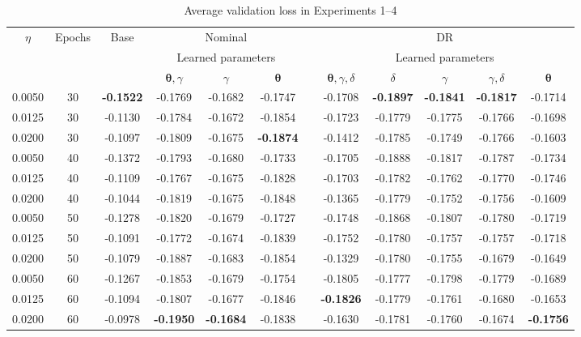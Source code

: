 \documentclass[10pt, twocolumn]{article}
\theoremstyle{plain}
\theoremstyle{definition}
\begin{document}
\begin{appendices}
\begin{table}[!ht]
\caption{Average validation loss in Experiments 1--4}
\centering
\begin{tabular}{ccccccr@{}ccccc}
\toprule
		$\eta$ &  Epochs & Base & \multicolumn{3}{c}{Nominal} && \multicolumn{5}{c}{DR} \\[0.5ex] \cline{4-6} \cline{8-12}
&&& \multicolumn{3}{c}{\footnotesize Learned parameters} && \multicolumn{5}{c}{\footnotesize Learned parameters}\\[-0.5ex]
\rule{0pt}{3ex}&& & \(\bm{\theta}, \gamma\) & \(\gamma\) & \(\bm{\theta}\) && \(\bm{\theta}, \gamma, \delta\) & \(\delta\) & \(\gamma\) & \(\gamma, \delta\) & \(\bm{\theta}\) \\
\midrule
0.0050 & 30 & \textbf{-0.1522} & -0.1769 & -0.1682 & -0.1747 && -0.1708 & \textbf{-0.1897} & \textbf{-0.1841} & \textbf{-0.1817} & -0.1714 \\
0.0125 & 30 & -0.1130 & -0.1784 & -0.1672 & -0.1854 && -0.1723 & -0.1779 & -0.1775 & -0.1766 &  -0.1698 \\
0.0200 & 30 & -0.1097 & -0.1809 & -0.1675 & \textbf{-0.1874} && -0.1412 & -0.1785 & -0.1749 & -0.1766 &     -0.1603 \\
\midrule
0.0050 & 40 & -0.1372 & -0.1793 & -0.1680 & -0.1733 && -0.1705 & -0.1888 & -0.1817 & -0.1787 &     -0.1734 \\
0.0125 & 40 & -0.1109 & -0.1767 & -0.1675 & -0.1828 && -0.1703 & -0.1782 & -0.1762 & -0.1770 &  -0.1746 \\
0.0200 & 40 & -0.1044 & -0.1819 & -0.1675 & -0.1848 && -0.1365 & -0.1779 & -0.1752 & -0.1756 & -0.1609 \\
\midrule
0.0050 & 50 & -0.1278 & -0.1820 & -0.1679 & -0.1727 && -0.1748 & -0.1868 & -0.1807 & -0.1780 & -0.1719 \\
0.0125 & 50 & -0.1091 & -0.1772 & -0.1674 & -0.1839 && -0.1752 & -0.1780 & -0.1757 & -0.1757 & -0.1718 \\
0.0200 & 50 & -0.1079 & -0.1887 & -0.1683 & -0.1854 && -0.1329 & -0.1780 & -0.1755 & -0.1679 & -0.1649 \\
\midrule
0.0050 & 60 & -0.1267 & -0.1853 & -0.1679 & -0.1754 && -0.1805 & -0.1777 & -0.1798 & -0.1779 & -0.1689 \\
0.0125 & 60 & -0.1094 & -0.1807 & -0.1677 & -0.1846 && \textbf{-0.1826} & -0.1779 & -0.1761 & -0.1680 & -0.1653 \\
0.0200 & 60 & -0.0978 & \textbf{-0.1950} & \textbf{-0.1684} & -0.1838 && -0.1630 & -0.1781 & -0.1760 & -0.1674 & \textbf{-0.1756} \\

\end{tabular}
\end{table}
\end{appendices}
\end{document}
